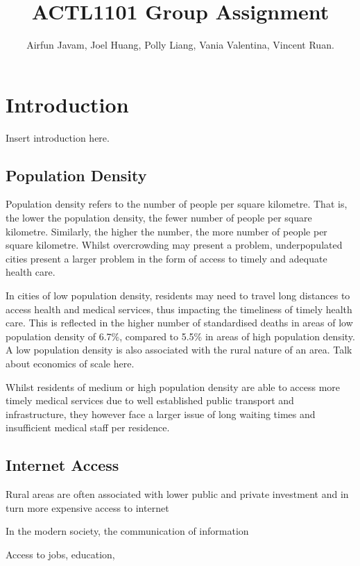 \documentclass[12pt,a4paper,oneside,reqno]{article}
\title{ACTL1101 Group Assignment}
\author{Airfun Javam, Joel Huang, Polly Liang, Vania Valentina, Vincent Ruan.}
\date{}
\begin{document}
	\maketitle
	\section{Introduction}
	Insert introduction here.
	\subsection{Population Density}
	Population density refers to the number of people per square kilometre. That is, the lower the population density, the fewer number of people per square kilometre. Similarly, the higher the number, the more number of people per square kilometre. Whilst overcrowding may present a problem, underpopulated cities present a larger problem in the form of access to timely and adequate health care.
	
	In cities of low population density, residents may need to travel long distances to access health and medical services, thus impacting the timeliness of timely health care. This is reflected in the higher number of standardised deaths in areas of low population density of 6.7\%, compared to 5.5\% in areas of high population density. A low population density is also associated with the rural nature of an area. Talk about economics of scale here.
	
	Whilst residents of medium or high population density are able to access more timely medical services due to well established public transport and infrastructure, they however face a larger issue of long waiting times and insufficient medical staff per residence.
	
	\subsection{Internet Access}
	Rural areas are often associated with lower public and private investment and in turn more expensive access to internet
	
	In the modern society, the communication of information 
	
	Access to jobs, education,
\end{document}
